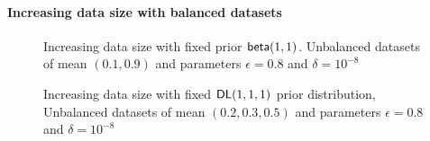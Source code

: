\documentclass[sigconf]{acmart}
\begin{document}
\paragraph{Increasing data size with balanced datasets}
\label{subsubsec_vs_datasize}

\begin{figure}[H]
\begin{center}
\centering
\caption{Increasing data size with fixed prior $\mathsf{beta}(1,1)$. Unbalanced datasets of mean $(0.1,0.9)$ and parameters $\epsilon = 0.8$ and $\delta = 10^{-8}$}
\label{fig_vs_datasize}
\end{center}
\end{figure}

\begin{figure}[ht]
\begin{center}
\centering
\caption{Increasing data size with fixed $\mathsf{DL}(1,1,1)$ prior distribution, Unbalanced datasets of mean $(0.2,0.3, 0.5)$ and parameters $\epsilon = 0.8$ and $\delta = 10^{-8}$}
\label{fig_vs_datasize_dir}
\end{center}
\end{figure}
\end{document}
